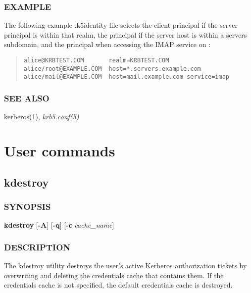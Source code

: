 \documentclass[letterpaper,10pt,english]{sphinxmanual}
\begin{document}
\subsection{EXAMPLE}
\label{user/user_config/k5identity:example}
The following example .k5identity file selects the client principal
 if the server principal is within that realm,
the principal  if the server host is within
a servers subdomain, and the principal  when
accessing the IMAP service on :
\begin{quote}

\begin{Verbatim}[commandchars=\\\{\}]
alice@KRBTEST.COM       realm=KRBTEST.COM
alice/root@EXAMPLE.COM  host=*.servers.example.com
alice/mail@EXAMPLE.COM  host=mail.example.com service=imap
\end{Verbatim}
\end{quote}


\subsection{SEE ALSO}
\label{user/user_config/k5identity:see-also}
kerberos(1), \emph{krb5.conf(5)}


\chapter{User commands}
\label{user/user_commands/index::doc}\label{user/user_commands/index:user-commands}\label{user/user_commands/index:id1}

\section{kdestroy}
\label{user/user_commands/kdestroy:kdestroy}\label{user/user_commands/kdestroy::doc}\label{user/user_commands/kdestroy:kdestroy-1}

\subsection{SYNOPSIS}
\label{user/user_commands/kdestroy:synopsis}
\textbf{kdestroy}
{[}\textbf{-A}{]}
{[}\textbf{-q}{]}
{[}\textbf{-c} \emph{cache\_name}{]}


\subsection{DESCRIPTION}
\label{user/user_commands/kdestroy:description}
The kdestroy utility destroys the user's active Kerberos authorization
tickets by overwriting and deleting the credentials cache that
contains them.  If the credentials cache is not specified, the default
credentials cache is destroyed.
\end{document}
